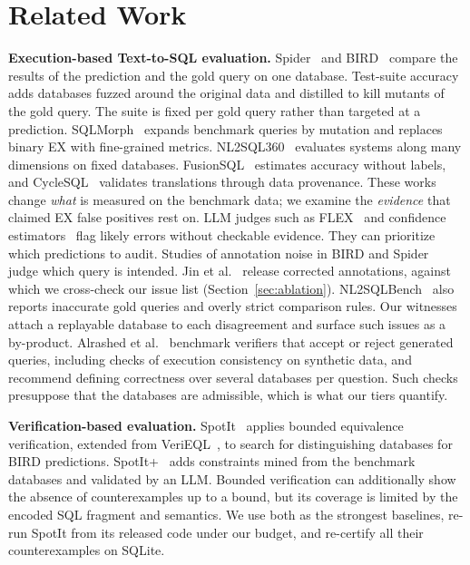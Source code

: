 \section{Related Work}\label{sec:related}

\textbf{Execution-based Text-to-SQL evaluation.} Spider~\cite{yu2018spider} and BIRD~\cite{li2023bird} compare the results of the prediction and the gold query on one database. Test-suite accuracy~\cite{zhong2020testsuite} adds databases fuzzed around the original data and distilled to kill mutants of the gold query. The suite is fixed per gold query rather than targeted at a prediction. SQLMorph~\cite{malekpour2026sqlmorph} expands benchmark queries by mutation and replaces binary EX with fine-grained metrics. NL2SQL360~\cite{li2024nl2sql360} evaluates systems along many dimensions on fixed databases. FusionSQL~\cite{pham2026fusionsql} estimates accuracy without labels, and CycleSQL~\cite{fan2025cyclesql} validates translations through data provenance. These works change \emph{what} is measured on the benchmark data; we examine the \emph{evidence} that claimed EX false positives rest on. LLM judges such as FLEX~\cite{kim2025flex} and confidence estimators~\cite{somov2025confidence,maleki2026confidence} flag likely errors without checkable evidence. They can prioritize which predictions to audit. Studies of annotation noise in BIRD and Spider~\cite{wretblad2024noise,jin2026annotation} judge which query is intended. Jin et al.~\cite{jin2026annotation} release corrected annotations, against which we cross-check our issue list (Section~\ref{sec:ablation}). NL2SQLBench~\cite{hou2026nl2sqlbench} also reports inaccurate gold queries and overly strict comparison rules. Our witnesses attach a replayable database to each disagreement and surface such issues as a by-product. Alrashed et al.~\cite{alrashed2026verification} benchmark verifiers that accept or reject generated queries, including checks of execution consistency on synthetic data, and recommend defining correctness over several databases per question. Such checks presuppose that the databases are admissible, which is what our tiers quantify.

\textbf{Verification-based evaluation.} SpotIt~\cite{klopfenstein2026spotit} applies bounded equivalence verification, extended from VeriEQL~\cite{he2024verieql}, to search for distinguishing databases for BIRD predictions. SpotIt+~\cite{tremante2026spotitplus} adds constraints mined from the benchmark databases and validated by an LLM. Bounded verification can additionally show the absence of counterexamples up to a bound, but its coverage is limited by the encoded SQL fragment and semantics. We use both as the strongest baselines, re-run SpotIt from its released code under our budget, and re-certify all their counterexamples on SQLite.

